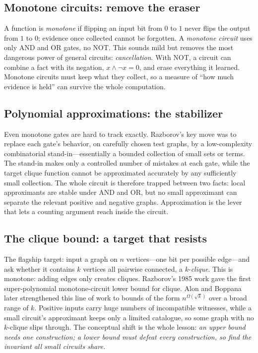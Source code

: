 \subsection{Monotone circuits: remove the eraser}
A function is \emph{monotone} if flipping an input bit from $0$ to $1$ never flips the output from $1$ to $0$; evidence once collected cannot be forgotten. A \emph{monotone circuit} uses only AND and OR gates, no NOT. This sounds mild but removes the most dangerous power of general circuits: \emph{cancellation}. With NOT, a circuit can combine a fact with its negation, $x\wedge\neg x=0$, and erase everything it learned. Monotone circuits must keep what they collect, so a measure of ``how much evidence is held'' can survive the whole computation.

\subsection{Polynomial approximations: the stabilizer}
Even monotone gates are hard to track exactly. Razborov's key move was to replace each gate's behavior, on carefully chosen test graphs, by a low-complexity combinatorial stand-in---essentially a bounded collection of small sets or terms. The stand-in makes only a controlled number of mistakes at each gate, while the target clique function cannot be approximated accurately by any sufficiently small collection. The whole circuit is therefore trapped between two facts: local approximants are stable under AND and OR, but no small approximant can separate the relevant positive and negative graphs. Approximation is the lever that lets a counting argument reach inside the circuit.

\subsection{The clique bound: a target that resists}
The flagship target: input a graph on $n$ vertices---one bit per possible edge---and ask whether it contains $k$ vertices all pairwise connected, a $k$-\emph{clique}. This is monotone: adding edges only creates cliques. Razborov's 1985 work gave the first super-polynomial monotone-circuit lower bound for clique. Alon and Boppana later strengthened this line of work to bounds of the form $n^{\Omega(\sqrt{k})}$ over a broad range of $k$. Positive inputs carry huge numbers of incompatible witnesses, while a small circuit's approximant keeps only a limited catalogue, so some graph with no $k$-clique slips through. The conceptual shift is the whole lesson: \emph{an upper bound needs one construction; a lower bound must defeat every construction, so find the invariant all small circuits share.}

